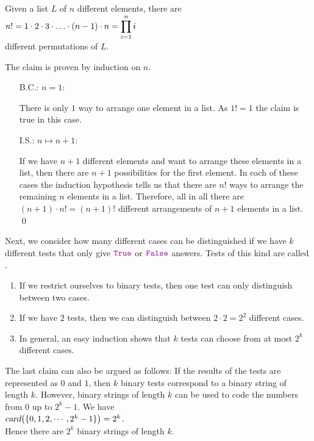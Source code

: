 \begin{Theorem}
Given a list $L$ of $n$ different elements, there are 
\\[0.2cm]
\hspace*{1.3cm}
$\displaystyle n! = 1 \cdot 2 \cdot 3 \cdot {\dots} \cdot (n-1) \cdot n = \prod\limits_{i=1}^n i$ 
\\[0.2cm]
different permutations of $L$. 
\end{Theorem}
\proof The claim is proven by induction on $n$. 
\begin{enumerate}
\item[B.C.:] $n=1$:  

      There is only $1$ way to arrange one element in a list.  As $1! = 1$ the claim is true in this case.
\item[I.S.:] $n \mapsto n+1$:
  
      If we have $n+1$ different elements and want to arrange these elements in a list, then there
      are $n+1$ possibilities for the first element.  In each of these cases the induction
      hypothesis tells us that there are $n!$ ways to arrange the remaining $n$ elements in a list.
      Therefore, all in all there are $(n+1) \cdot n! = (n+1)!$ different arrangements of $n+1$
      elements in a list. \qed
\end{enumerate}
Next, we consider how many different cases can be distinguished if we have $k$ different tests
that only give $\mytt{True}$ or $\mytt{False}$ answers.  Tests of this kind are called .
\begin{enumerate}
\item If we restrict ourselves to binary tests, then one test can only distinguish between two cases.
\item If we have $2$ tests, then we can distinguish between  $2 \cdot 2 = 2^2$ different cases.
\item In general, an easy induction shows that $k$ tests can choose from at most $2^k$ different cases.
\end{enumerate}
The last claim can also be argued as follows:  If the results of the tests are represented as
$0$ and $1$, then $k$ binary tests correspond to a binary string of length
$k$.  However, binary strings of length $k$ can be used to code the numbers from $0$ up to
$2^{k}-1$.  We have
\\[0.2cm]
\hspace*{1.3cm}
$\textsl{card}\bigl(\{0,1,2,\cdots, 2^k-1\}\bigr) = 2^k$.
\\[0.2cm]
Hence there are $2^k$ binary strings of length $k$.  

